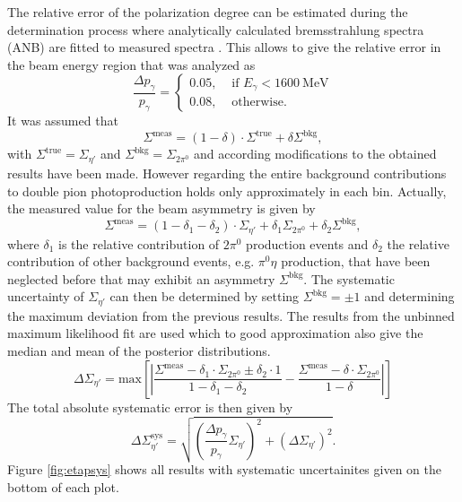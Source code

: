 The relative error of the polarization degree can be estimated during the determination process where analytically calculated bremsstrahlung spectra (ANB) are fitted to measured spectra \cite{farahphd}. This allows to give the relative error in the beam energy region that was analyzed as \cite{farahphd}
\begin{equation}
	\frac{\Delta p_\gamma}{p_\gamma}=
	\begin{cases}
		0.05,& \text{ if } E_\gamma<\SI{1600}{\mega\eV}\\
		0.08,& \text{ otherwise. }
	\end{cases}
\end{equation}
It was assumed that 
\begin{equation}
	\Sigma^\text{meas}=\left(1-\delta\right)\cdot\Sigma^\text{true}+\delta\Sigma^\text{bkg},
\end{equation}
with $\Sigma^\text{true}=\Sigma_{\eta'}$ and $\Sigma^\text{bkg}=\Sigma_{2\pi^0}$ and according modifications to the obtained results have been made. However regarding the entire background contributions to double pion photoproduction holds only approximately in each bin. Actually, the measured value for the beam asymmetry is given by \begin{equation}
\Sigma^\text{meas}=\left(1-\delta_1-\delta_2\right)\cdot\Sigma_{\eta'}+\delta_1\Sigma_{2\pi^0}+\delta_2\Sigma^\text{bkg},
\end{equation}
where $\delta_1$ is the relative contribution of $2\pi^0$ production events and $\delta_2$ the relative contribution of other background events, e.g. $\pi^0\eta$ production, that have been neglected before that may exhibit an asymmetry $\Sigma^\text{bkg}$. The systematic uncertainty of $\Sigma_{\eta'}$ can then be determined by setting $\Sigma^\text{bkg}=\pm1$ and determining the maximum deviation from the previous results. The results from the unbinned maximum likelihood fit are used which to good approximation also give the median and mean of the posterior distributions.
\begin{equation}
	\Delta\Sigma_{\eta'}=\text{max}\left[\left|\frac{\Sigma^\text{meas}-\delta_1\cdot\Sigma_{2\pi^0}\pm\delta_2\cdot1}{1-\delta_1-\delta_2}-\frac{\Sigma^\text{meas}-\delta\cdot\Sigma_{2\pi^0}}{1-\delta}\right|\right]
\end{equation}
The total absolute systematic error is then given by
\begin{equation}
	\Delta\Sigma_{\eta'}^\text{sys}=\sqrt{\left(\frac{\Delta p_\gamma}{p_\gamma}\Sigma_{\eta'}\right)^2+\left(\Delta\Sigma_{\eta'}\right)^2}.
\end{equation}
Figure \ref{fig:etapsys} shows all results with systematic uncertainites given on the bottom of each plot.

